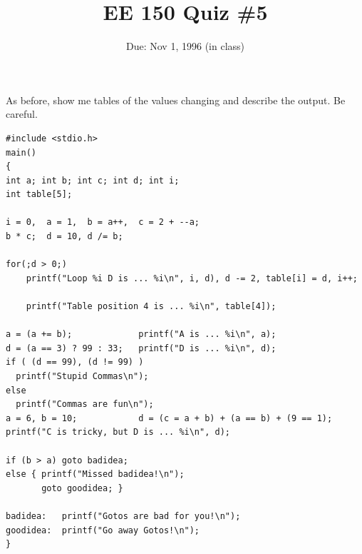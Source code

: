 \setcounter{page}{1}



\title{EE 150 Quiz \#5}
\author{Due: Nov 1, 1996 (in class)}
\date{}
\maketitle

As before, show me tables of the values changing and describe the
output.  Be careful.

\begin{verbatim}
#include <stdio.h>
main()
{
int a; int b; int c; int d; int i;
int table[5];

i = 0,  a = 1,  b = a++,  c = 2 + --a; 
b * c;  d = 10, d /= b;

for(;d > 0;)
    printf("Loop %i D is ... %i\n", i, d), d -= 2, table[i] = d, i++;

    printf("Table position 4 is ... %i\n", table[4]);

a = (a += b);             printf("A is ... %i\n", a);
d = (a == 3) ? 99 : 33;   printf("D is ... %i\n", d); 
if ( (d == 99), (d != 99) )
  printf("Stupid Commas\n");
else
  printf("Commas are fun\n");
a = 6, b = 10;            d = (c = a + b) + (a == b) + (9 == 1);
printf("C is tricky, but D is ... %i\n", d);   

if (b > a) goto badidea;
else { printf("Missed badidea!\n");
       goto goodidea; }
	
badidea:   printf("Gotos are bad for you!\n");
goodidea:  printf("Go away Gotos!\n");
}
\end{verbatim}


